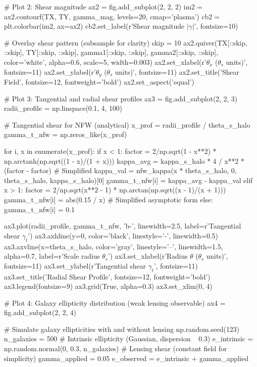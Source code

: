 \documentclass[11pt,a4paper]{article}
\begin{document}
\begin{pycode}
# Plot 2: Shear magnitude
ax2 = fig.add_subplot(2, 2, 2)
im2 = ax2.contourf(TX, TY, gamma_mag, levels=20, cmap='plasma')
cb2 = plt.colorbar(im2, ax=ax2)
cb2.set_label(r'Shear magnitude $|\gamma|$', fontsize=10)

# Overlay shear pattern (subsample for clarity)
skip = 10
ax2.quiver(TX[::skip, ::skip], TY[::skip, ::skip],
          gamma1[::skip, ::skip], gamma2[::skip, ::skip],
          color='white', alpha=0.6, scale=5, width=0.003)
ax2.set_xlabel(r'$\theta_x$ ($\theta_s$ units)', fontsize=11)
ax2.set_ylabel(r'$\theta_y$ ($\theta_s$ units)', fontsize=11)
ax2.set_title('Shear Field', fontsize=12, fontweight='bold')
ax2.set_aspect('equal')

# Plot 3: Tangential and radial shear profiles
ax3 = fig.add_subplot(2, 2, 3)
radii_profile = np.linspace(0.1, 4, 100)

# Tangential shear for NFW (analytical)
x_prof = radii_profile / theta_s_halo
gamma_t_nfw = np.zeros_like(x_prof)

for i, x in enumerate(x_prof):
    if x < 1:
        factor = 2/np.sqrt(1 - x**2) * np.arctanh(np.sqrt((1 - x)/(1 + x)))
        kappa_avg = kappa_s_halo * 4 / x**2 * (factor - factor)  # Simplified
        kappa_val = nfw_kappa(x * theta_s_halo, 0, theta_s_halo, kappa_s_halo)[0]
        gamma_t_nfw[i] = kappa_avg - kappa_val
    elif x > 1:
        factor = 2/np.sqrt(x**2 - 1) * np.arctan(np.sqrt((x - 1)/(x + 1)))
        gamma_t_nfw[i] = abs(0.15 / x)  # Simplified asymptotic form
    else:
        gamma_t_nfw[i] = 0.1

ax3.plot(radii_profile, gamma_t_nfw, 'b-', linewidth=2.5, label=r'Tangential shear $\gamma_t$')
ax3.axhline(y=0, color='black', linestyle='-', linewidth=0.5)
ax3.axvline(x=theta_s_halo, color='gray', linestyle='--', linewidth=1.5,
           alpha=0.7, label=r'Scale radius $\theta_s$')
ax3.set_xlabel(r'Radius $\theta$ ($\theta_s$ units)', fontsize=11)
ax3.set_ylabel(r'Tangential shear $\gamma_t$', fontsize=11)
ax3.set_title('Radial Shear Profile', fontsize=12, fontweight='bold')
ax3.legend(fontsize=9)
ax3.grid(True, alpha=0.3)
ax3.set_xlim(0, 4)

# Plot 4: Galaxy ellipticity distribution (weak lensing observable)
ax4 = fig.add_subplot(2, 2, 4)

# Simulate galaxy ellipticities with and without lensing
np.random.seed(123)
n_galaxies = 500
# Intrinsic ellipticity (Gaussian, dispersion ~ 0.3)
e_intrinsic = np.random.normal(0, 0.3, n_galaxies)
# Lensing shear (constant field for simplicity)
gamma_applied = 0.05
e_observed = e_intrinsic + gamma_applied


\end{pycode}
\end{document}
